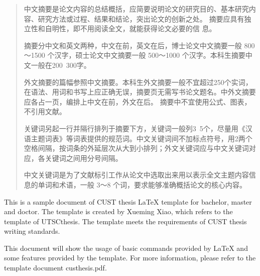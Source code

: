 

\begin{abstract}
  中文摘要是论文内容的总结概括，应简要说明论文的研究目的、基本研究内容、研究方法或过程、结果和结论，突出论文的创新之处。
  摘要应具有独立性和自明性，即不用阅读全文，就能获得论文必要的信
  息。
  
  摘要分中文和英文两种，中文在前，英文在后，博士论文中文摘要一般 800～1500 个汉字，硕士论文中文摘要一般 500～1000 个汉字。本科生摘要中文一般在200~300字。
  
  外文摘要的篇幅参照中文摘要。本科生外文摘要一般不宜超过250个实词，在语法、用词和书写上应正确无误，摘要页无需写书论文题名。中外文摘要应各占一页，编排上中文在前，外文在后。
  摘要中不宜使用公式、图表，不引用文献。

  关键词另起一行并隔行排列于摘要下方，关键词一般列3~5个，尽量用《汉语主题词表》等词表提供的规范词。中文关键词间不加标点符号，用2两个空格间隔，按词条的外延层次从大到小排列；外文关键词应与中文关键词对应，各关键词之间用分号间隔。
  


  中文关键词是为了文献标引工作从论文中选取出来用以表示全文主题内容信息的单词和术语，一般 3～8 个词，要求能够准确概括论文的核心内容。
\end{abstract}

\begin{abstract*}
  This is a sample document of CUST thesis \LaTeX{} template for bachelor, master and doctor. The template is created by Xueming Xiao, which refers to the template of UTSCthesis. The template meets the requirements of CUST thesis writing standards.

  This document will show the usage of basic commands provided by \LaTeX{} and some features provided by the template. For more information, please refer to
  the template document custhesis.pdf.
  \end{abstract*}
